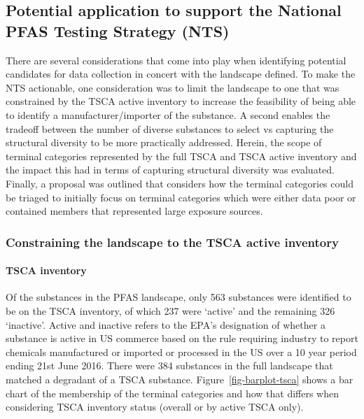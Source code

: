 \documentclass[
  super,
  preprint,
  3p]{elsarticle}
\let\oldparagraph\paragraph
\renewcommand{\paragraph}[1]{\oldparagraph{#1}\mbox{}}
\begin{document}
\hypertarget{sec-tsca}{%
\subsection{Potential application to support the National PFAS Testing
Strategy (NTS)}\label{sec-tsca}}

There are several considerations that come into play when identifying
potential candidates for data collection in concert with the landscape
defined. To make the NTS actionable, one consideration was to limit the
landscape to one that was constrained by the TSCA active inventory to
increase the feasibility of being able to identify a
manufacturer/importer of the substance. A second enables the tradeoff
between the number of diverse substances to select vs capturing the
structural diversity to be more practically addressed. Herein, the scope
of terminal categories represented by the full TSCA and TSCA active
inventory and the impact this had in terms of capturing structural
diversity was evaluated. Finally, a proposal was outlined that considers
how the terminal categories could be triaged to initially focus on
terminal categories which were either data poor or contained members
that represented large exposure sources.

\hypertarget{constraining-the-landscape-to-the-tsca-active-inventory}{%
\subsubsection{Constraining the landscape to the TSCA active
inventory}\label{constraining-the-landscape-to-the-tsca-active-inventory}}

\hypertarget{tsca-inventory}{%
\paragraph{TSCA inventory}\label{tsca-inventory}}

Of the substances in the PFAS landscape, only 563 substances were
identified to be on the TSCA inventory, of which 237 were `active' and
the remaining 326 `inactive'. Active and inactive refers to the EPA's
designation of whether a substance is active in US commerce based on the
rule requiring industry to report chemicals manufactured or imported or
processed in the US over a 10 year period ending 21st June 2016. There
were 384 substances in the full landscape that matched a degradant of a
TSCA substance. Figure~\ref{fig-barplot-tsca} shows a bar chart of the
membership of the terminal categories and how that differs when
considering TSCA inventory status (overall or by active TSCA only).
\end{document}
